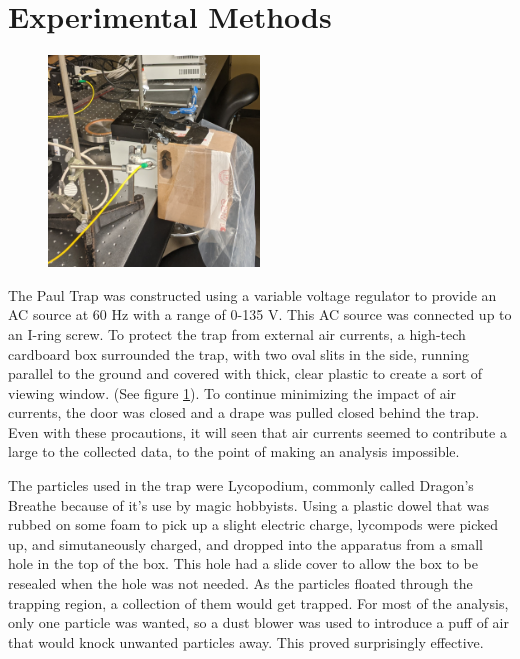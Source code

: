 \documentclass[12pt]{article}
\begin{document}

\section{Experimental Methods}
\begin{figure}[ht]
\centering
    \includegraphics[width=0.5\textwidth]{paul_trap.jpg}
	\caption{}
    \label{fig:paul_trap}
\end{figure}

The Paul Trap was constructed using a variable voltage regulator to provide an AC source at 60 Hz with a range of 0-135 V. This AC source was connected up to an I-ring screw. To protect the trap from external air currents, a high-tech cardboard box surrounded the trap, with two oval slits in the side, running parallel to the ground and covered with thick, clear plastic to create a sort of viewing window. (See figure \ref{fig:paul_trap}). To continue minimizing the impact of air currents, the door was closed and a drape was pulled closed behind the trap. Even with these procautions, it will seen that air currents seemed to contribute a large to the collected data, to the point of making an analysis impossible. 

The particles used in the trap were Lycopodium, commonly called Dragon's Breathe because of it's use by magic hobbyists. Using a plastic dowel that was rubbed on some foam to pick up a slight electric charge, lycompods were picked up, and simutaneously charged, and dropped into the apparatus from a small hole in the top of the box. This hole had a slide cover to allow the box to be resealed when the hole was not needed. As the particles floated through the trapping region, a collection of them would get trapped. For most of the analysis, only one particle was wanted, so a dust blower was used to introduce a puff of air that would knock unwanted particles away. This proved surprisingly effective. 
\end{document}
